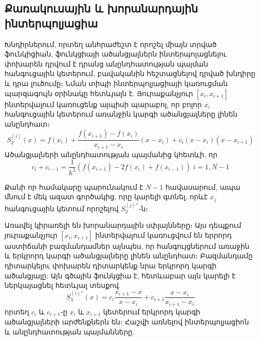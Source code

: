 \documentclass[fleqn, bachelor,subf,12pt,notitlepage]{article}
\begin{document}
\subsection*{Քառակուսային և խորանարդային ինտերպոլյացիա}
Խնդիրներում, որտեղ անհրաժեշտ է որոշել միայն տրված ֆունկիցիան, ֆունկցիայի ածանցյալներն ինտերպոլացնելու փոխարեն դրվում է դրանց անընդհատության պայման հանգուցային կետերում,  բավականին հեշտացնելով դրված խնդիրը և դրա լուծումը։
Նման տիպի ինտերպոլյացիայի կառուցման պարզագույն օրինակը հետևյալն է.
Յուրաքանչյուր $\left[x_{i}, x_{i+1}\right]$ ինտերվալում կառուցենք այպիսի պարաբոլ, որ բոլոր $x_{i}$ հանգուցային կետերում առանջին կարգի ածանցյալները լինեն անընդհատ։
\begin{equation}
S_{2}^{(i)}(x)=f(x_{i})+\dfrac{f(x_{i+1})-f(x_{i})}{x_{i+1}-x_{i}}\left(x-x_{i}\right)+c_{i}\left(x-x_{i}\right)\left(x-x_{i+1}\right)
\end{equation}
Ածանցյալների անընդհատության պայմանից կհետևի, որ
\begin{equation}
c_{i}+c_{i-1}=\dfrac{1}{h^{2}}\left(f(x_{i+1})-2f(x_{i})+f(x_{i-1})\right) \; i=\overline{1, N-1}
\end{equation}

Քանի որ համակարը պարունակում է $N-1$ հավասարում, ապա մնում է մեկ ազատ գործակից, որը կարելի գտնել, որևէ $x_{j}$ հանգուցային կետում որոշելով $S_{2}^{(j)''}$֊ն։


Առավել կիրառելի են խորանարդային սփլայնները։ Այս դեպքում յուրաքանչյուր $\left[x_{i}, x_{i+1}\right]$ ինտերվալում կառուցվում են երրորդ աստիճանի բազմանդամներ այնպես, որ հանգույցներում առաջին և երկրորդ կարգի ածանցյալները լինեն անընդհատ։ 
Բազմանդամը դիտարկելու փոխարեն դիտարկենք նրա երկրորդ կարգի ածանցյալը: Այն գծային ֆունկցիա է, հետևաբար այն կարելի է ներկայացնել հետևյալ տեսքով.
\begin{equation}
S^{(i)''}_3(x)=c_{i}\dfrac{x_{i+1}-x}{x-x_{i}}+c_{i+1}\dfrac{x-x_{i}}{x_{i+1}-x_{i}}
\end{equation}
\noindent որտեղ $c_{i}$ և $c_{i+1}$֊ը $x_{i}$ և $x_{i+1}$ կետերում երկրորդ կարգի ածանցյալների արժենքներն են։ 
\noindent Հաշվի առնելով ինտերպոլյացիոն և անընդհատության պայմանները.
\end{document}
